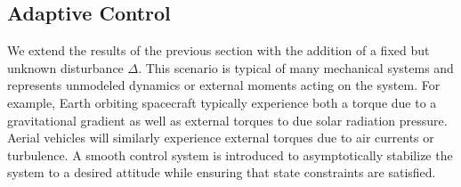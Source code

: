 \documentclass[letterpaper, 10 pt, conference]{ieeeconf}  %
\begin{document}
\subsection{Adaptive Control}
We extend the results of the previous section with the addition of a fixed but unknown disturbance \( \Delta \).
This scenario is typical of many mechanical systems and represents unmodeled dynamics or external moments acting on the system.
For example, Earth orbiting spacecraft typically experience both a torque due to a gravitational gradient as well as external torques to due solar radiation pressure.
Aerial vehicles will similarly experience external torques due to air currents or turbulence.
A smooth control system is introduced to asymptotically stabilize the system to a desired attitude while ensuring that state constraints are satisfied.
\end{document}
